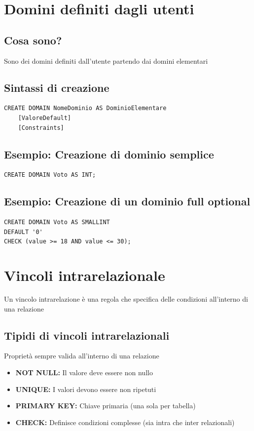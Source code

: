 \section{Domini definiti dagli utenti}
\subsection{Cosa sono?}
Sono dei domini definiti dall'utente partendo dai domini elementari

\subsection{Sintassi di creazione}
\begin{lstlisting}[language=sql_generic]
CREATE DOMAIN NomeDominio AS DominioElementare
    [ValoreDefault]
    [Constraints]    
\end{lstlisting}

\subsection{Esempio: Creazione di dominio semplice}
\begin{lstlisting}[language=sql_generic]
CREATE DOMAIN Voto AS INT;
\end{lstlisting}
\subsection{Esempio: Creazione di un dominio full optional}
\begin{lstlisting}[language=sql_generic]
CREATE DOMAIN Voto AS SMALLINT
DEFAULT '0'
CHECK (value >= 18 AND value <= 30);
\end{lstlisting}

\section{Vincoli intrarelazionale}
Un vincolo intrarelazione è una regola che specifica delle condizioni all'interno di una relazione

\subsection{Tipidi di vincoli intrarelazionali}
Proprietà sempre valida all'interno di una relazione
\begin{itemize}
    \item \textbf{NOT NULL:} Il valore deve essere non nullo
    \item \textbf{UNIQUE:} I valori devono essere non ripetuti
    \item \textbf{PRIMARY KEY:} Chiave primaria (una sola per tabella)
    \item \textbf{CHECK:} Definisce condizioni complesse (sia intra che inter relazionali)
\end{itemize}

